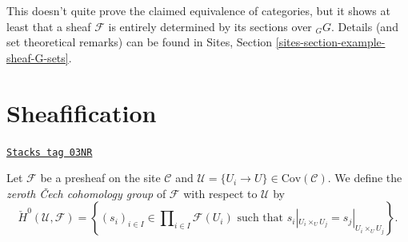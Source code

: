 This doesn't quite prove the claimed equivalence of categories, but it shows at
least that a sheaf $\mathcal{F}$ is entirely determined by its sections over
${}_G G$. Details (and set theoretical remarks) can be found in
Sites, Section \ref{sites-section-example-sheaf-G-sets}.

\section{Sheafification}
\label{etale-cohomology-section-sheafification}
\begin{definition}[0 cech]
\label{etale-cohomology-definition-0-cech}
\href{https://stacks.math.columbia.edu/tag/03NR}{\texttt{Stacks tag 03NR}}

Let $\mathcal{F}$ be a presheaf on the site $\mathcal{C}$ and
$\mathcal{U} = \{U_i \to U\} \in \text{Cov} (\mathcal{C})$.
We define the {\it zeroth {\v C}ech cohomology group} of
$\mathcal{F}$ with respect to $\mathcal{U}$ by
$$
\check H^0 (\mathcal{U}, \mathcal{F}) =
\left\{
(s_i)_{i\in I} \in \prod\nolimits_{i\in I }\mathcal{F}(U_i)
\text{ such that }
s_i|_{U_i \times_U U_j} = s_j |_{U_i \times_U U_j}
\right\}.
$$
\end{definition}

